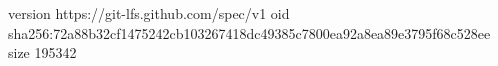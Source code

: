 version https://git-lfs.github.com/spec/v1
oid sha256:72a88b32cf1475242cb103267418dc49385c7800ea92a8ea89e3795f68c528ee
size 195342
